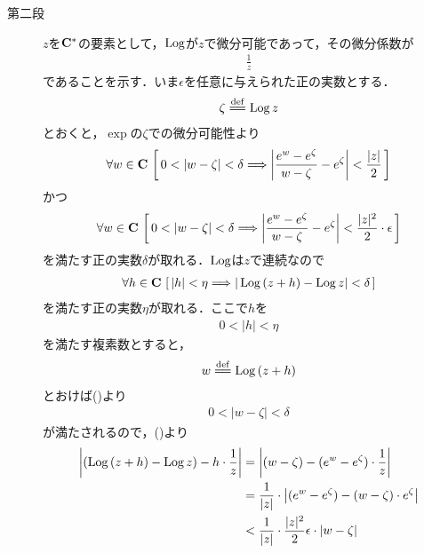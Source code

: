 \begin{sketch}
\begin{description}
			\item[第二段]
				$z$を$\mathbf{C}^*$の要素として，$\operatorname{Log}$が$z$で微分可能であって，その微分係数が
				\begin{align}
					\frac{1}{z}
				\end{align}
				であることを示す．いま$\epsilon$を任意に与えられた正の実数とする．
				\begin{align}
					\zeta \defeq \pvlog{z}
				\end{align}
				とおくと，$\exp$の$\zeta$での微分可能性より
				\begin{align}
					\forall w \in \mathbf{C}\, 
					\left[\, 0 < |w - \zeta| < \delta
					\Longrightarrow \left|\frac{e^{w} - e^{\zeta}}{w-\zeta} - e^{\zeta}\right| < \frac{|z|}{2}\, \right]
					\label{fom:thm_pv_log_is_holomorphic_2}
				\end{align}
				かつ
				\begin{align}
					\forall w \in \mathbf{C}\, 
					\left[\, 0 < |w - \zeta| < \delta
					\Longrightarrow \left|\frac{e^{w} - e^{\zeta}}{w-\zeta} - e^{\zeta}\right| < \frac{|z|^2}{2} \cdot \epsilon\, \right]
					\label{fom:thm_pv_log_is_holomorphic_3}
				\end{align}
				を満たす正の実数$\delta$が取れる．$\operatorname{Log}$は$z$で連続なので
				\begin{align}
					\forall h \in \mathbf{C}\,
					\left[\, |h| < \eta \Longrightarrow 
					|\operatorname{Log}{(z+h)} - \operatorname{Log}{z}| < \delta\, \right]
					\label{fom:thm_pv_log_is_holomorphic_4}
				\end{align}
				を満たす正の実数$\eta$が取れる．ここで$h$を
				\begin{align}
					0 < |h| < \eta
				\end{align}
				を満たす複素数とすると，
				\begin{align}
					w \defeq \pvlog{(z+h)}
				\end{align}
				とおけば()より
				\begin{align}
					0 < |w - \zeta| < \delta
				\end{align}
				が満たされるので，()より
				\begin{align}
					\left|(\pvlog{(z+h)} - \pvlog{z}) - h \cdot \frac{1}{z}\right|
					&= \left|(w - \zeta) - (e^{w} - e^{\zeta}) \cdot \frac{1}{z}\right| \\
					&= \frac{1}{|z|} \cdot \left|(e^{w} - e^{\zeta}) - (w - \zeta) \cdot e^{\zeta}\right| \\
					&< \frac{1}{|z|} \cdot \frac{|z|^2}{2} \epsilon \cdot |w - \zeta| \\

\end{align}
\end{description}
\end{sketch}
